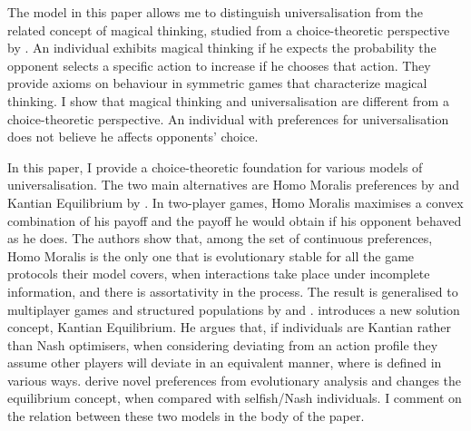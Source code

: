 The model in this paper allows me to distinguish universalisation from the related concept of magical thinking, studied from a choice-theoretic perspective by \cite{daleyMagicalThinkingRepresentation2017}. An individual exhibits magical thinking if he expects the probability the opponent selects a specific action to increase if he chooses that action. They provide axioms on behaviour in symmetric games that characterize magical thinking. I show that magical thinking and universalisation are different from a choice-theoretic perspective. An individual with preferences for universalisation does not believe he affects opponents' choice.

In this paper, I provide a choice-theoretic foundation for various models of universalisation. The two main alternatives are Homo Moralis preferences by \cite{algerHomoMoralisPreference2013,alger2016evolution,algerEvolutionPreferencesStructured2020} and Kantian Equilibrium by \cite{roemerKantianEquilibrium2010,roemerKantianOptimizationMicrofoundation2015,roemer2019we}. In two-player games, Homo Moralis maximises a convex combination of his payoff and the payoff he would obtain if his opponent behaved as he does. The authors show that, among the set of continuous preferences, Homo Moralis is the only one that is  evolutionary stable for all the game protocols their model covers, when interactions take place under incomplete information, and there is assortativity in the process. The result is generalised to multiplayer games and structured populations by \cite{alger2016evolution} and \cite{algerEvolutionPreferencesStructured2020}. \cite{roemer2019we} introduces a new solution concept, Kantian Equilibrium. He argues that, if individuals are Kantian rather than Nash optimisers, when considering deviating from an action profile they assume other players will deviate in an equivalent manner, where  is defined in various ways. \citeauthor{algerHomoMoralisPreference2013} derive novel preferences from evolutionary analysis and \citeauthor{roemerKantianOptimizationMicrofoundation2015} changes the equilibrium concept, when compared with selfish/Nash individuals. I comment on the relation between these two models in the body of the paper.

